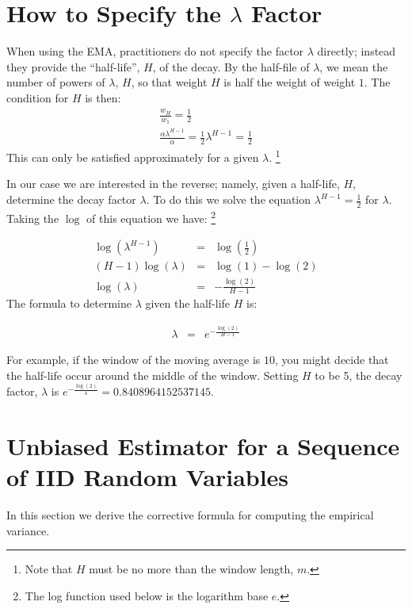 \documentclass{article}
\begin{document}
\section{How to Specify the $\lambda$ Factor}
When using the EMA, practitioners do not specify the factor $\lambda$ directly; 
instead they provide the ``half-life'', $H$,  of the decay.
By the half-file of $\lambda$, we mean the number of powers of $\lambda$, $H$, so that
weight $H$ is half the weight of weight $1$. The condition for $H$ is then:
\begin{eqnarray}
	\frac{w_H}{w_1} = \frac{1}{2} \\
	\frac{\alpha \lambda^{H-1}}{\alpha} = \frac{1}{2}
	\lambda^{H-1} = \frac{1}{2}
\end{eqnarray}
This can only be satisfied approximately for a given $\lambda$. 
\footnote{Note that $H$ must be no more than the window length, $m$.} 

In our case we are interested in the reverse; namely, given a half-life, $H$, 
determine the decay factor $\lambda$. To do this we solve the equation $\lambda^{H-1} = \frac{1}{2}$
for $\lambda$.
Taking the $\log$ of this equation we have:%
\footnote{The log function used below is the logarithm base $e$.}

\begin{eqnarray*}
	\log(\lambda^{H-1}) &=&  \log\left(\frac{1}{2}\right) \\
	(H-1) \log(\lambda) &=& \log(1) - \log(2)  \\
    \log(\lambda)   &=& -\frac{\log(2)}{H-1} 
\end{eqnarray*}
The formula to determine $\lambda$ given the half-life $H$ is:

\begin{eqnarray}
    \lambda &=& e^{-\frac{\log(2)}{H-1}}
\end{eqnarray}

For example, if the window of the moving average is $10$, you might decide that the 
half-life occur around the middle of the window. Setting $H$ to be 5, the decay factor, $\lambda$ 
is $e^{-\frac{\log(2)}{4}} = 0.8408964152537145$.

\eject

\appendix

\section{Unbiased Estimator for a Sequence of IID Random Variables}
In this section we derive the corrective formula for computing the empirical variance.
\end{document}

